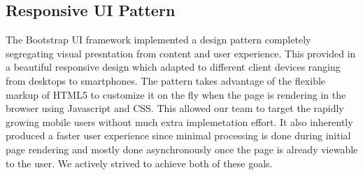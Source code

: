 \subsection{Responsive UI Pattern}
The Bootstrap UI framework implemented a design pattern completely segregating visual presntation from content and user experience. This provided in a beautiful responsive design which adapted to different client devices ranging from desktops to smartphones. The pattern takes advantage of the flexible markup of HTML5 to customize it on the fly when the page is rendering in the browser using Javascript and CSS. This allowed our team to target the rapidly growing mobile users without much extra implemetation effort. It also inherently produced a faster user experience since minimal processing is done during initial page rendering and mostly done asynchronously once the page is already viewable to the user. We actively strived to achieve both of these goals.
